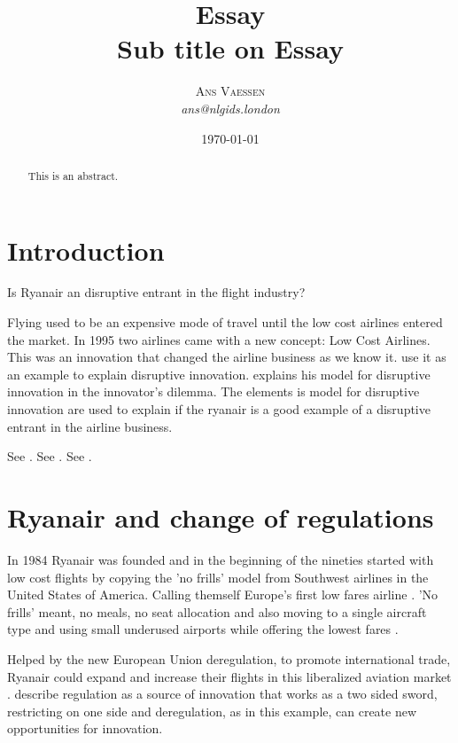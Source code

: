 \documentclass[a4paper, 11pt]{article}
\title{\textbf{Essay}\\Sub title on Essay}
\author{\textsc{Ans Vaessen}
\\{\textit{ans@nlgids.london}}}
\date{\today}
\begin{document}
\maketitle

\begin{abstract}
This is an abstract.
\end{abstract}

\vspace{30pt} %

\section*{Introduction}
Is Ryanair an disruptive entrant in the flight industry?


Flying used to be an expensive mode of travel until the low cost airlines entered the market. In 1995 two airlines came with a new concept: Low Cost Airlines. This was an innovation that changed the airline business as we know it. \cite{tiddbessant} use it as an example to explain disruptive innovation. \citep{Christensen97} explains his model for disruptive innovation in the innovator's dilemma. The elements is model for disruptive innovation are used to explain if the ryanair is a good example of a disruptive entrant in the airline business.


See \cite{Christensen97}.
See \citep{Christensen97}.
See \citep[p. 145]{Christensen97}.

\section{Ryanair and change of regulations}

In 1984 Ryanair was founded and in the beginning of the nineties started with low cost flights by copying the 'no frills' model from Southwest airlines in the United States of America. Calling themself Europe’s first low fares airline \cite{Ryanair}. 'No frills' meant, no meals, no seat allocation and also moving to a single aircraft type and using small underused airports while offering the lowest fares \citep{Diaconu}.

Helped by the new European Union deregulation, to promote international trade, Ryanair could expand and increase their flights in this liberalized aviation market \citep{Dianconu}. \cite{TiddBessant} describe regulation as a source of innovation that works as a two sided sword, restricting on one side and deregulation, as in this example, can create new opportunities for innovation.
\end{document}
